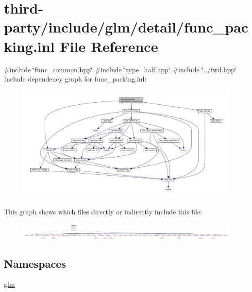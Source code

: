 \hypertarget{func__packing_8inl}{}\section{third-\/party/include/glm/detail/func\+\_\+packing.inl File Reference}
\label{func__packing_8inl}
{\ttfamily \#include \char`\"{}func\+\_\+common.\+hpp\char`\"{}}\newline
{\ttfamily \#include \char`\"{}type\+\_\+half.\+hpp\char`\"{}}\newline
{\ttfamily \#include \char`\"{}../fwd.\+hpp\char`\"{}}\newline
Include dependency graph for func\+\_\+packing.\+inl\+:
\nopagebreak
\begin{figure}[H]
\begin{center}
\leavevmode
\includegraphics[width=350pt]{func__packing_8inl__incl}
\end{center}
\end{figure}
This graph shows which files directly or indirectly include this file\+:
\nopagebreak
\begin{figure}[H]
\begin{center}
\leavevmode
\includegraphics[width=350pt]{func__packing_8inl__dep__incl}
\end{center}
\end{figure}
\subsection*{Namespaces}
\begin{DoxyCompactItemize}
\item 
 \hyperlink{namespaceglm}{glm}
\end{DoxyCompactItemize}
